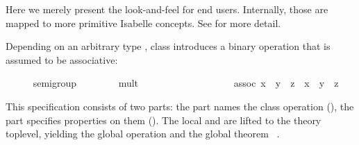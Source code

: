 \begin{isabellebody}
\begin{isamarkuptext}
  Here we merely present the look-and-feel for end users.
  Internally, those are mapped to more primitive Isabelle concepts.
  See \cite{haftmann_wenzel2006classes} for more detail.%
\end{isamarkuptext}%
\isamarkuptrue%
%
\isamarkuptrue%
%
\isamarkuptrue%
%
\begin{isamarkuptext}%
Depending on an arbitrary type \isa{{\isasymalpha}}, class  introduces a binary operation \isa{{\isasymcirc}} that is
  assumed to be associative:%
\end{isamarkuptext}%
\isamarkuptrue%
\ \ \ \ \isamarkupfalse%
\ semigroup\ {\isacharequal}\isanewline
\ \ \ \ \ \ \ mult\ {\isacharcolon}{\isacharcolon}\ {\isachardoublequoteopen}{\isasymalpha}\ {\isasymRightarrow}\ {\isasymalpha}\ {\isasymRightarrow}\ {\isasymalpha}{\isachardoublequoteclose}\ \ \ \ {\isacharparenleft}\ {\isachardoublequoteopen}\isactrlloc {\isasymotimes}{\isachardoublequoteclose}\ {}{}{\isacharparenright}\isanewline
\ \ \ \ \ \ \ assoc{\isacharcolon}\ {\isachardoublequoteopen}{\isacharparenleft}x\ \isactrlloc {\isasymotimes}\ y{\isacharparenright}\ \isactrlloc {\isasymotimes}\ z\ {\isacharequal}\ x\ \isactrlloc {\isasymotimes}\ {\isacharparenleft}y\ \isactrlloc {\isasymotimes}\ z{\isacharparenright}{\isachardoublequoteclose}%
\begin{isamarkuptext}%
\noindent This \isa{{\isasymCLASS}} specification consists of two
  parts: the  part names the class operation (\isa{{\isasymFIXES}}), the  part specifies properties on them
  (\isa{{\isasymASSUMES}}).  The local \isa{{\isasymFIXES}} and \isa{{\isasymASSUMES}} are lifted to the theory toplevel, yielding the global
  operation  and the
  global theorem ~.%
\end{isamarkuptext}%

\end{isabellebody}
